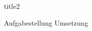 \documentclass{article}
\begin{document}
{title2}

\frontmatter

\tableofcontents

\listoffigures
\listoftables
\mainmatter
    {Aufgabestellung}
    \newpage
    {Umsetzung}
\end{document}
